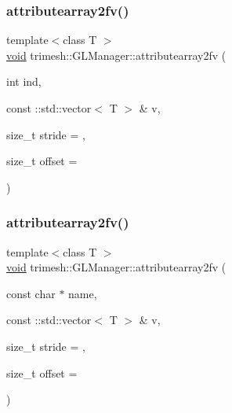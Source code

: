 \subsubsection{\texorpdfstring{attributearray2fv()}{attributearray2fv()}\hspace{0.1cm}{\footnotesize\ttfamily [3/6]}}
{\footnotesize\ttfamily template$<$class T $>$ \\
\hyperlink{namespacetrimesh_a784ddfd979e1c579bda795a8edfc3f43}{void} trimesh\+::\+G\+L\+Manager\+::attributearray2fv (\begin{DoxyParamCaption}\item[{int}]{ind,  }\item[{const \+::std\+::vector$<$ T $>$ \&}]{v,  }\item[{size\+\_\+t}]{stride = {},  }\item[{size\+\_\+t}]{offset = {} }\end{DoxyParamCaption})\hspace{0.3cm}{\ttfamily [inline]}}

\mbox{\label{classtrimesh_1_1GLManager_a273a2ac2f366fd5594eaf19f90188978}} 
\subsubsection{\texorpdfstring{attributearray2fv()}{attributearray2fv()}\hspace{0.1cm}{\footnotesize\ttfamily [4/6]}}
{\footnotesize\ttfamily template$<$class T $>$ \\
\hyperlink{namespacetrimesh_a784ddfd979e1c579bda795a8edfc3f43}{void} trimesh\+::\+G\+L\+Manager\+::attributearray2fv (\begin{DoxyParamCaption}\item[{const char $\ast$}]{name,  }\item[{const \+::std\+::vector$<$ T $>$ \&}]{v,  }\item[{size\+\_\+t}]{stride = {},  }\item[{size\+\_\+t}]{offset = {} }\end{DoxyParamCaption})\hspace{0.3cm}{\ttfamily [inline]}}

\mbox{\label{classtrimesh_1_1GLManager_aaa548adb6d61e8b89baf862adf8f0372}} 
